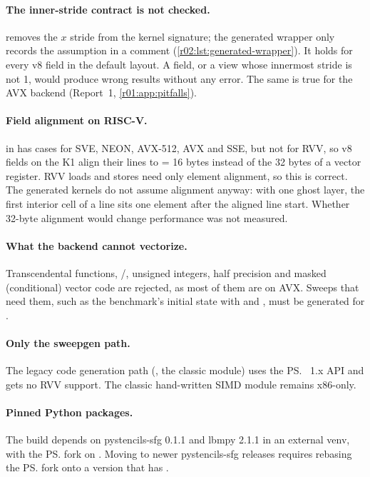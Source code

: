 \paragraph{The inner-stride contract is not checked.}\label{r02:sec:lim-stride}
 removes the $x$ stride from the kernel signature; the
generated wrapper only records the assumption in a comment
(\cref{r02:lst:generated-wrapper}). It holds for every v8 field in the default
 layout. A  field, or a view whose innermost stride is not 1, would
produce wrong results without any error. The same is true for the AVX backend (Report~1,
\cref{r01:app:pitfalls}).

\paragraph{Field alignment on RISC-V.}\label{r02:sec:lim-alignment}
 in  has cases for
SVE, NEON, AVX-512, AVX and SSE, but not for RVV, so v8 fields on the K1 align their
lines to  = 16 bytes instead of the 32 bytes of a vector
register. RVV loads and stores need only element alignment, so this is correct. The
generated kernels do not assume alignment anyway: with one ghost layer, the first
interior cell of a line sits one element after the aligned line start. Whether 32-byte
alignment would change performance was not measured.

\paragraph{What the backend cannot vectorize.}
Transcendental functions, /, unsigned integers, half precision and
masked (conditional) vector code are rejected, as most of them are on AVX. Sweeps that
need them, such as the benchmark's initial state with  and ,
must be generated for .

\paragraph{Only the sweepgen path.}
The legacy code generation path (, the classic
 module) uses the \ps{}~1.x API and gets no RVV support. The
classic hand-written SIMD module  remains x86-only.

\paragraph{Pinned Python packages.}
The build depends on pystencils-sfg 0.1.1 and lbmpy 2.1.1 in an external venv, with the
\ps{} fork on . Moving to newer pystencils-sfg releases requires
rebasing the \ps{} fork onto a version that has .

